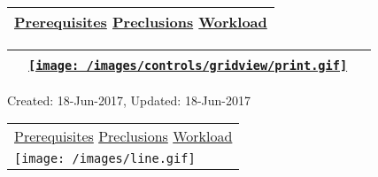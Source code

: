 ~

\hypertarget{ctl00_ctl00_ContentPlaceHolder1_ContentPlaceHolder1_pnlReferences}{}
\begin{longtable}[]{@{}l@{}}
\toprule
\protect\hypertarget{ctl00_ctl00_ContentPlaceHolder1_ContentPlaceHolder1_lblSectionBottom}{}{\protect\hyperlink{Prerequisites}{Prerequisites}
\textbar{} \protect\hyperlink{Preclusions}{Preclusions} \textbar{}
\protect\hyperlink{Workload}{Workload}}\tabularnewline
\bottomrule
\end{longtable}

\hypertarget{ctl00_ctl00_ContentPlaceHolder1_ContentPlaceHolder1_UP}{}
\hypertarget{contentstart}{}
\hypertarget{ctl00_ctl00_ContentPlaceHolder1_ContentPlaceHolder1_pnlMain}{}
\begin{longtable}[]{@{}ll@{}}
\toprule
&
{\href{javascript:PrintThisPage();}{\texttt{[image: /images/controls/gridview/print.gif]}}~~}\tabularnewline
\bottomrule
\end{longtable}

\protect\hypertarget{ctl00_ctl00_ContentPlaceHolder1_ContentPlaceHolder1_LV_UpdateInfo_ctrl0_txtDate}{}{Created:
18-Jun-2017, Updated: 18-Jun-2017}

\begin{longtable}[]{@{}l@{}}
\toprule
\protect\hypertarget{ctl00_ctl00_ContentPlaceHolder1_ContentPlaceHolder1_lblSectionTop}{}{\protect\hyperlink{Prerequisites}{Prerequisites}
\textbar{} \protect\hyperlink{Preclusions}{Preclusions} \textbar{}
\protect\hyperlink{Workload}{Workload}}\tabularnewline
\texttt{[image: /images/line.gif]}\tabularnewline
\bottomrule
\end{longtable}

